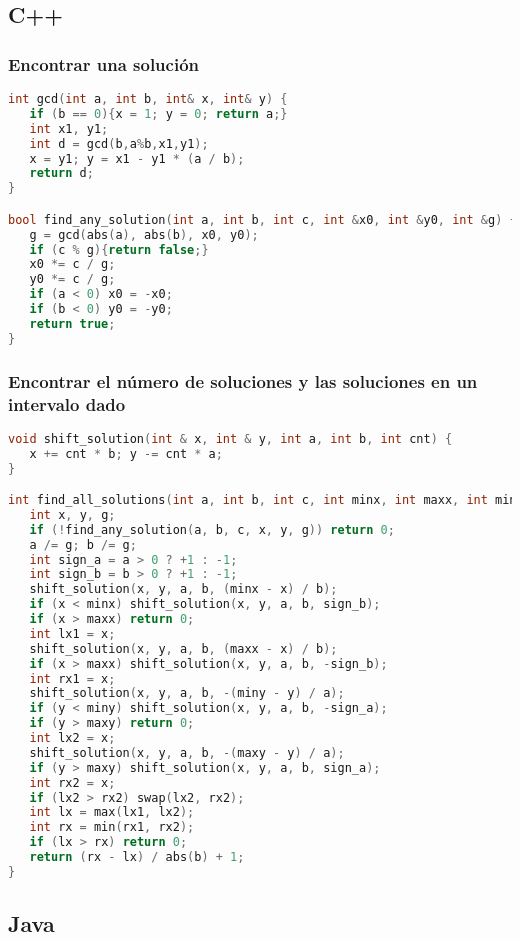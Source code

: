 \subsection{C++}

\subsubsection{Encontrar una solución}
\begin{lstlisting}[language=C++]
int gcd(int a, int b, int& x, int& y) {
   if (b == 0){x = 1; y = 0; return a;}
   int x1, y1;
   int d = gcd(b,a%b,x1,y1);
   x = y1; y = x1 - y1 * (a / b);
   return d;
}

bool find_any_solution(int a, int b, int c, int &x0, int &y0, int &g) {
   g = gcd(abs(a), abs(b), x0, y0);
   if (c % g){return false;}
   x0 *= c / g;
   y0 *= c / g;
   if (a < 0) x0 = -x0;
   if (b < 0) y0 = -y0;
   return true;
}
\end{lstlisting}

\subsubsection{Encontrar el número de soluciones y las soluciones en un intervalo dado}
\begin{lstlisting}[language=C++]
void shift_solution(int & x, int & y, int a, int b, int cnt) {
   x += cnt * b; y -= cnt * a;
}

int find_all_solutions(int a, int b, int c, int minx, int maxx, int miny, int maxy) {
   int x, y, g;
   if (!find_any_solution(a, b, c, x, y, g)) return 0;
   a /= g; b /= g;
   int sign_a = a > 0 ? +1 : -1;
   int sign_b = b > 0 ? +1 : -1;
   shift_solution(x, y, a, b, (minx - x) / b);
   if (x < minx) shift_solution(x, y, a, b, sign_b);
   if (x > maxx) return 0;
   int lx1 = x;
   shift_solution(x, y, a, b, (maxx - x) / b);
   if (x > maxx) shift_solution(x, y, a, b, -sign_b);
   int rx1 = x;
   shift_solution(x, y, a, b, -(miny - y) / a);
   if (y < miny) shift_solution(x, y, a, b, -sign_a);
   if (y > maxy) return 0;
   int lx2 = x;
   shift_solution(x, y, a, b, -(maxy - y) / a);
   if (y > maxy) shift_solution(x, y, a, b, sign_a);
   int rx2 = x;
   if (lx2 > rx2) swap(lx2, rx2);
   int lx = max(lx1, lx2);
   int rx = min(rx1, rx2);
   if (lx > rx) return 0;
   return (rx - lx) / abs(b) + 1;
}
\end{lstlisting}


\subsection{Java}

